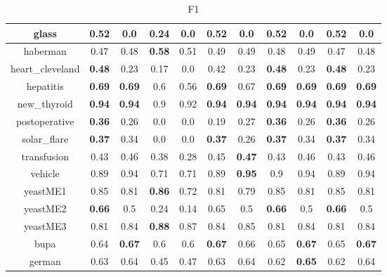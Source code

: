 \begin{table}[H]
\begin{center}
{\begin{tabular}{c|cccccccccc}
							\hline%
							glass&\textbf{0.52}&0.0&0.24&0.0&\textbf{0.52}&0.0&\textbf{0.52}&0.0&\textbf{0.52}&0.0\\%
							\hline%
							haberman&0.47&0.48&\textbf{0.58}&0.51&0.49&0.49&0.48&0.49&0.47&0.48\\%
							\hline%
							heart\_cleveland&\textbf{0.48}&0.23&0.17&0.0&0.42&0.23&\textbf{0.48}&0.23&\textbf{0.48}&0.23\\%
							\hline%
							hepatitis&\textbf{0.69}&\textbf{0.69}&0.6&0.56&\textbf{0.69}&0.67&\textbf{0.69}&\textbf{0.69}&\textbf{0.69}&\textbf{0.69}\\%
							\hline%
							new\_thyroid&\textbf{0.94}&\textbf{0.94}&0.9&0.92&\textbf{0.94}&\textbf{0.94}&\textbf{0.94}&\textbf{0.94}&\textbf{0.94}&\textbf{0.94}\\%
							\hline%
							postoperative&\textbf{0.36}&0.26&0.0&0.0&0.19&0.27&\textbf{0.36}&0.26&\textbf{0.36}&0.26\\%
							\hline%
							solar\_flare&\textbf{0.37}&0.34&0.0&0.0&\textbf{0.37}&0.26&\textbf{0.37}&0.34&\textbf{0.37}&0.34\\%
							\hline%
							transfusion&0.43&0.46&0.38&0.28&0.45&\textbf{0.47}&0.43&0.46&0.43&0.46\\%
							\hline%
							vehicle&0.89&0.94&0.71&0.71&0.89&\textbf{0.95}&0.9&0.94&0.89&0.94\\%
							\hline%
							yeastME1&0.85&0.81&\textbf{0.86}&0.72&0.81&0.79&0.85&0.81&0.85&0.81\\%
							\hline%
							yeastME2&\textbf{0.66}&0.5&0.24&0.14&0.65&0.5&\textbf{0.66}&0.5&\textbf{0.66}&0.5\\%
							\hline%
							yeastME3&0.81&0.84&\textbf{0.88}&0.87&0.84&0.85&0.81&0.84&0.81&0.84\\%
							\hline%
							bupa&0.64&\textbf{0.67}&0.6&0.6&\textbf{0.67}&0.66&0.65&\textbf{0.67}&0.65&\textbf{0.67}\\%
							\hline%
							german&0.63&0.64&0.45&0.47&0.63&0.64&0.62&\textbf{0.65}&0.62&0.64\\%
							\hline%
						\end{tabular}
					}%
					\caption{F1}
					\label{tab4}
				\end{center}
			\end{table}